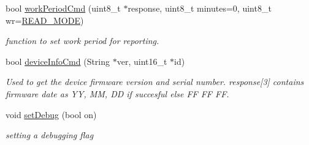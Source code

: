\begin{DoxyCompactItemize}
bool \mbox{\hyperlink{classsds011_adb6b05a9fb97fa175dfa3d7194681f3d}{work\+Period\+Cmd}} (uint8\+\_\+t $\ast$response, uint8\+\_\+t minutes=0, uint8\+\_\+t wr=\mbox{\hyperlink{sds011lib_8h_a064cc7153fdb5596b2079d865dd9e055}{R\+E\+A\+D\+\_\+\+M\+O\+DE}})
\begin{DoxyCompactList}\small\item\em function to set work period for reporting. \end{DoxyCompactList}\item 
bool \mbox{\hyperlink{classsds011_ac0dfdae3b5b512aca1fbe287da29616a}{device\+Info\+Cmd}} (String $\ast$ver, uint16\+\_\+t $\ast$id)
\begin{DoxyCompactList}\small\item\em Used to get the device firmware version and serial number. response\mbox{[}3\mbox{]} contains firmware date as YY, MM, DD if succesful else FF FF FF. \end{DoxyCompactList}\item 
void \mbox{\hyperlink{classsds011_a359f7baaa2272648ef381ed04f604a11}{set\+Debug}} (bool on)
\begin{DoxyCompactList}\small\item\em setting a debugging flag \end{DoxyCompactList}\end{DoxyCompactItemize}
